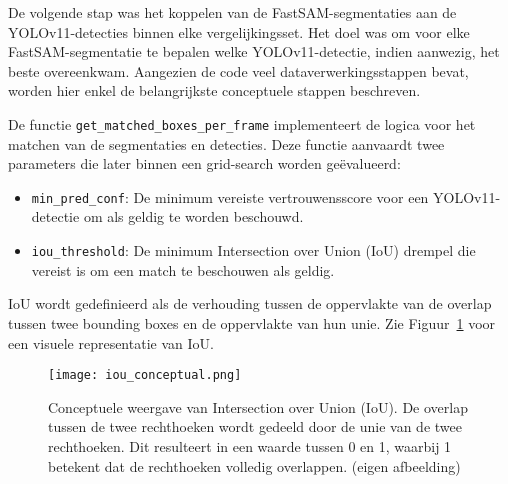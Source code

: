 De volgende stap was het koppelen van de FastSAM-segmentaties aan de\\ YOLOv11-detecties binnen elke vergelijkingsset.
Het doel was om voor elke FastSAM-segmentatie te bepalen welke YOLOv11-detectie, indien aanwezig, het beste overeenkwam.
Aangezien de code veel dataverwerkingsstappen bevat, worden hier enkel de belangrijkste conceptuele stappen beschreven.

De functie \texttt{get\_matched\_boxes\_per\_frame} implementeert de logica voor het matchen van de segmentaties en detecties.
Deze functie aanvaardt twee parameters die later binnen een grid-search worden geëvalueerd:
\begin{itemize}
  \item \texttt{min\_pred\_conf}: De minimum vereiste vertrouwensscore voor een YOLOv11-detectie om als geldig te worden beschouwd.
  \item \texttt{iou\_threshold}: De minimum Intersection over Union (IoU) drempel die vereist is om een match te beschouwen als geldig.  
\end{itemize}
IoU wordt gedefinieerd als de verhouding tussen de oppervlakte van de overlap tussen twee bounding boxes en de oppervlakte van hun unie.
Zie Figuur~\ref{fig:iou-conceptual} voor een visuele representatie van IoU.

\begin{figure}[H]
    \centering
    \texttt{[image: iou\_conceptual.png]}
    \caption[Conceptuele weergave van Intersection over Union (IoU)]{
        \label{fig:iou-conceptual}
        Conceptuele weergave van Intersection over Union (IoU).
        De overlap tussen de twee rechthoeken wordt gedeeld door de unie van de twee rechthoeken.
        Dit resulteert in een waarde tussen 0 en 1, waarbij 1 betekent dat de rechthoeken volledig overlappen.
        (eigen afbeelding)
      }
\end{figure}

